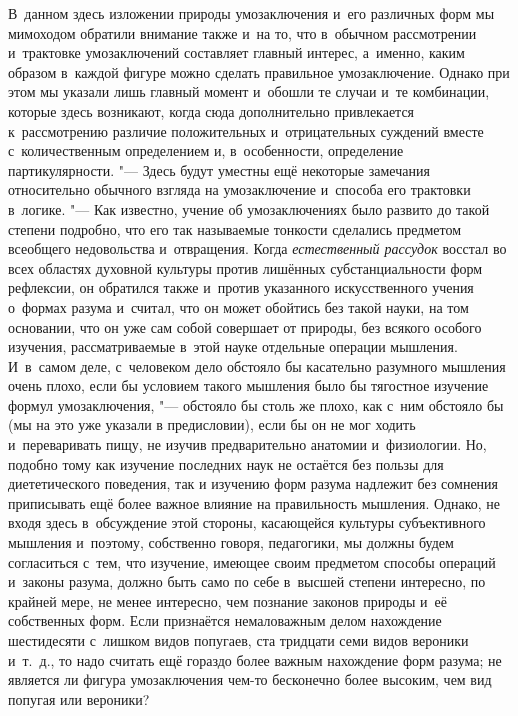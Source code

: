 
В~данном здесь изложении природы умозаключения и~его различных
форм мы мимоходом обратили внимание также и~на то, что в~обычном
рассмотрении и~трактовке умозаключений составляет главный
интерес, а~именно, каким образом в~каждой фигуре можно сделать правильное
умозаключение. Однако при этом мы указали лишь главный момент и~обошли те
случаи и~те комбинации, которые здесь возникают, когда сюда дополнительно
привлекается к~рассмотрению различие положительных и~отрицательных суждений
вместе с~количественным определением и, в~особенности, определение
партикулярности. "--- Здесь будут уместны ещё некоторые
замечания относительно обычного взгляда на умозаключение и~способа его
трактовки в~логике. "--- Как известно, учение об умозаключениях
было развито до такой степени подробно, что его так называемые тонкости
сделались предметом всеобщего недовольства и~отвращения. Когда
{\em естественный рассудок}
восстал во всех областях духовной культуры против лишённых
субстанциальности форм рефлексии, он обратился также и~против указанного
искусственного учения о~формах разума и~считал, что он может обойтись без
такой науки, на том основании, что он уже сам собой совершает от природы,
без всякого особого изучения, рассматриваемые в~этой науке отдельные
операции мышления. И~в~самом деле, с~человеком дело обстояло бы касательно
разумного мышления очень плохо, если бы условием такого мышления было бы
тягостное изучение формул умозаключения, "--- обстояло бы столь
же плохо, как с~ним обстояло бы (мы на это уже указали в
предисловии),
если бы он не мог ходить и~переваривать пищу, не изучив
предварительно анатомии и~физиологии. Но, подобно тому как изучение
последних наук не остаётся без пользы для диететического поведения, так и
изучению форм разума надлежит без сомнения приписывать ещё более важное
влияние на правильность мышления. Однако, не входя здесь в~обсуждение этой
стороны, касающейся культуры субъективного мышления и~поэтому, собственно
говоря, педагогики, мы должны будем согласиться с~тем, что изучение,
имеющее своим предметом способы операций и~законы разума, должно быть само
по себе в~высшей степени интересно, по крайней мере, не менее интересно,
чем познание законов природы и~её собственных форм. Если признаётся
немаловажным делом нахождение шестидесяти с~лишком видов попугаев, ста
тридцати семи видов вероники и~т.~д., то надо считать ещё гораздо более
важным нахождение форм разума; не является ли фигура умозаключения чем-то
бесконечно более высоким, чем вид попугая или вероники?

